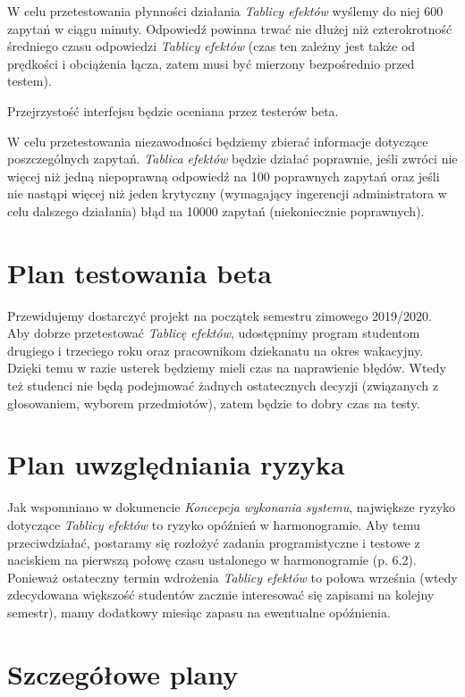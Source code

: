 \documentclass{article}
\begin{document}
W celu przetestowania płynności działania \textit{Tablicy efektów} wyślemy do niej 600 zapytań w ciągu minuty.
Odpowiedź powinna trwać nie dłużej niż czterokrotność średniego czasu odpowiedzi \textit{Tablicy efektów} (czas ten zależny jest także od prędkości i obciążenia łącza, zatem musi być mierzony bezpośrednio przed testem).

Przejrzystość interfejsu będzie oceniana przez testerów beta.

W celu przetestowania niezawodności będziemy zbierać informacje dotyczące poszczególnych zapytań.
\textit{Tablica efektów} będzie działać poprawnie, jeśli zwróci nie więcej niż jedną niepoprawną odpowiedź na 100 poprawnych zapytań oraz jeśli nie nastąpi więcej niż jeden krytyczny (wymagający ingerencji administratora w celu dalszego działania) błąd na 10000 zapytań (niekoniecznie poprawnych).

\newpage

\section{Plan testowania beta}
Przewidujemy dostarczyć projekt na początek semestru zimowego 2019/2020.
Aby dobrze przetestować \textit{Tablicę efektów}, udostępnimy program studentom drugiego i trzeciego roku oraz pracownikom dziekanatu na okres wakacyjny.
Dzięki temu w razie usterek będziemy mieli czas na naprawienie błędów.
Wtedy też studenci nie będą podejmować żadnych ostatecznych decyzji (związanych z głosowaniem, wyborem przedmiotów), zatem będzie to dobry czas na testy.

\section{Plan uwzględniania ryzyka}
Jak wspomniano w dokumencie \textit{Koncepcja wykonania systemu}, największe ryzyko dotyczące \textit{Tablicy efektów} to ryzyko opóźnień w harmonogramie.
Aby temu przeciwdziałać, postaramy się rozłożyć zadania programistyczne i testowe z naciskiem na pierwszą połowę czasu ustalonego w harmonogramie (p. 6.2).
Ponieważ ostateczny termin wdrożenia \textit{Tablicy efektów} to połowa września (wtedy zdecydowana większość studentów zacznie interesować się zapisami na kolejny semestr), mamy dodatkowy miesiąc zapasu na ewentualne opóźnienia.

\section{Szczegółowe plany}
\end{document}
